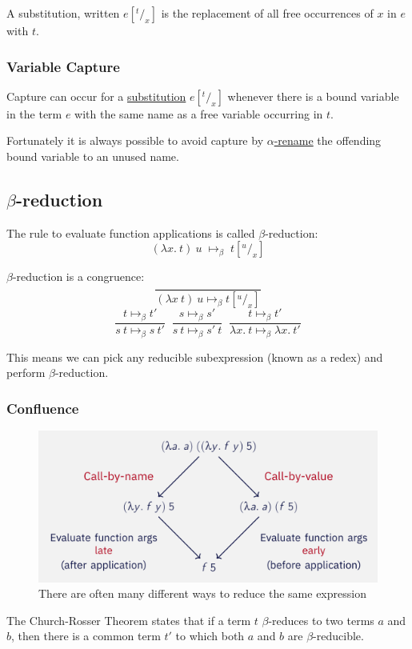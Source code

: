 \documentclass{article}
\begin{document}
A substitution, written $e[^t/_x]$ is the replacement of all free occurrences of $x$ in $e$ with $t$.

\subsubsection{Variable Capture}
Capture can occur for a \hyperref[substitution]{substitution} $e[^t/_x]$ whenever there is a bound variable in the term $e$ with the same name as a free variable occurring in $t$.

Fortunately it is always possible to avoid capture by \hyperref[alpha-renaming]{$\alpha$-rename} the offending bound variable to an unused name.

\subsection{$\beta$-reduction}\label{beta-reduction}
The rule to evaluate function applications is called $\beta$-reduction:
\[(\lambda x.\:t)\:u \; \mapsto_\beta \; t[^u/_x]\]

$\beta$-reduction is a congruence:
\[\frac{}{(\lambda x\:t)\:u \mapsto_\beta t[^u/_x]}\]
\[\frac{t \mapsto_\beta t'}{s\:t \mapsto_\beta s\:t'}\;\;\frac{s \mapsto_\beta s'}{s\:t \mapsto_\beta s'\:t}\;\;\frac{t \mapsto_\beta t'}{\lambda x.\:t \mapsto_\beta \lambda x.\:t'}\]

This means we can pick any reducible subexpression (known as a redex) and perform $\beta$-reduction.

\subsubsection{Confluence}\label{confluence}\label{church-rosser}
\begin{figure}[H]
    \centering
    \includegraphics[width=0.75\linewidth]{images/call-by.png}
    \caption{There are often many different ways to reduce the same expression}
\end{figure}

The Church-Rosser Theorem states that if a term $t$ $\beta$-reduces to two terms $a$ and $b$, then there is a common term $t'$ to which both $a$ and $b$ are $\beta$-reducible.
\end{document}
